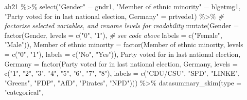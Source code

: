 \documentclass[
]{article}
\newenvironment{Shaded}{\begin{snugshade}}{\end{snugshade}}
\newcommand{\AttributeTok}[1]{\textcolor[rgb]{0.77,0.63,0.00}{#1}}
\newcommand{\CommentTok}[1]{\textcolor[rgb]{0.56,0.35,0.01}{\textit{#1}}}
\newcommand{\FunctionTok}[1]{\textcolor[rgb]{0.00,0.00,0.00}{#1}}
\newcommand{\NormalTok}[1]{#1}
\newcommand{\OtherTok}[1]{\textcolor[rgb]{0.56,0.35,0.01}{#1}}
\newcommand{\SpecialCharTok}[1]{\textcolor[rgb]{0.00,0.00,0.00}{#1}}
\newcommand{\StringTok}[1]{\textcolor[rgb]{0.31,0.60,0.02}{#1}}
\begin{document}
\begin{Shaded}
\begin{Highlighting}[]
\NormalTok{ah21 }\SpecialCharTok{\%\textgreater{}\%}
  \FunctionTok{select}\NormalTok{(}\StringTok{"Gender"} \OtherTok{=}\NormalTok{ gndr1, }\StringTok{"Member of ethnic minority"} \OtherTok{=}\NormalTok{ blgetmg1, }
         \StringTok{"Party voted for in last national election, Germany"} \OtherTok{=}\NormalTok{ prtvede1) }\SpecialCharTok{\%\textgreater{}\%}
  \CommentTok{\# factorise selected variables, and rename levels for readability }
  \FunctionTok{mutate}\NormalTok{(}\AttributeTok{Gender =} \FunctionTok{factor}\NormalTok{(Gender, }\AttributeTok{levels =} \FunctionTok{c}\NormalTok{(}\StringTok{"0"}\NormalTok{, }\StringTok{"1"}\NormalTok{), }
                         \CommentTok{\# see code above }
                         \AttributeTok{labels =} \FunctionTok{c}\NormalTok{(}\StringTok{"Female"}\NormalTok{, }\StringTok{"Male"}\NormalTok{)),}
         \StringTok{\textasciigrave{}}\AttributeTok{Member of ethnic minority}\StringTok{\textasciigrave{}} \OtherTok{=} \FunctionTok{factor}\NormalTok{(}\StringTok{\textasciigrave{}}\AttributeTok{Member of ethnic minority}\StringTok{\textasciigrave{}}\NormalTok{, }
                                              \AttributeTok{levels =} \FunctionTok{c}\NormalTok{(}\StringTok{"0"}\NormalTok{, }\StringTok{"1"}\NormalTok{), }
                                              \AttributeTok{labels =} \FunctionTok{c}\NormalTok{(}\StringTok{"No"}\NormalTok{, }\StringTok{"Yes"}\NormalTok{)),}
         \StringTok{\textasciigrave{}}\AttributeTok{Party voted for in last national election, Germany}\StringTok{\textasciigrave{}} \OtherTok{=} 
           \FunctionTok{factor}\NormalTok{(}\StringTok{\textasciigrave{}}\AttributeTok{Party voted for in last national election, Germany}\StringTok{\textasciigrave{}}\NormalTok{, }
                  \AttributeTok{levels =} \FunctionTok{c}\NormalTok{(}\StringTok{"1"}\NormalTok{, }\StringTok{"2"}\NormalTok{, }\StringTok{"3"}\NormalTok{, }\StringTok{"4"}\NormalTok{, }\StringTok{"5"}\NormalTok{, }\StringTok{"6"}\NormalTok{, }\StringTok{"7"}\NormalTok{, }\StringTok{"8"}\NormalTok{),}
                  \AttributeTok{labels =} \FunctionTok{c}\NormalTok{(}\StringTok{"CDU/CSU"}\NormalTok{, }\StringTok{"SPD"}\NormalTok{, }\StringTok{"LINKE"}\NormalTok{, }\StringTok{"Greens"}\NormalTok{, }\StringTok{"FDP"}\NormalTok{, }
                             \StringTok{"AfD"}\NormalTok{, }\StringTok{"Pirates"}\NormalTok{, }\StringTok{"NPD"}\NormalTok{))) }\SpecialCharTok{\%\textgreater{}\%}
  \FunctionTok{datasummary\_skim}\NormalTok{(}\AttributeTok{type =} \StringTok{"categorical"}\NormalTok{,}

\end{Highlighting}
\end{Shaded}
\end{document}
